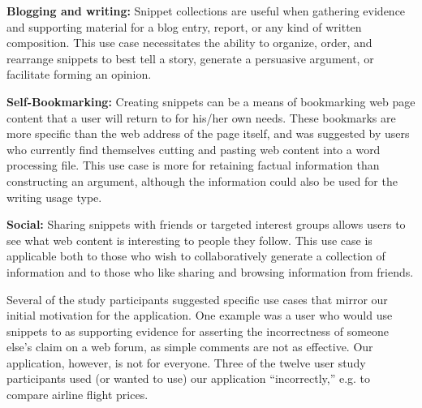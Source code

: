 \documentclass{sig-alt-release2}
\begin{document}
\textbf{Blogging and writing:} Snippet collections are useful when gathering evidence and supporting material for a blog entry, report, or any kind of written composition. This use case necessitates the ability to organize, order, and rearrange snippets to best tell a story, generate a persuasive argument, or facilitate forming an opinion.

\textbf{Self-Bookmarking:} Creating snippets can be a means of bookmarking web page content that a user will return to for his/her own needs. These bookmarks are more specific than the web address of the page itself, and was suggested by users who currently find themselves cutting and pasting web content into a word processing file. This use case is more for retaining factual information than constructing an argument, although the information could also be used for the writing usage type.

\textbf{Social:} Sharing snippets with friends or targeted interest groups allows users to see what web content is interesting to people they follow. This use case is applicable both to those who wish to collaboratively generate a collection of information and to those who like sharing and browsing information from friends.

Several of the study participants suggested specific use cases that mirror our initial motivation for the application. One example was a user who would use snippets to as supporting evidence for asserting the incorrectness of someone else's claim on a web forum, as simple comments are not as effective. Our application, however, is not for everyone. Three of the twelve user study participants used (or wanted to use) our application ``incorrectly,'' e.g. to compare airline flight prices.
\end{document}
